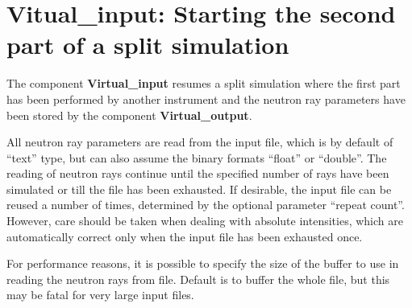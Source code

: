 \section{Vitual\_input: Starting the second part of a split simulation}
\label{virtual_input}


The component {\bf Virtual\_input} resumes a split simulation where the 
first part has been performed by another instrument and the neutron ray
parameters have been stored by the component {\bf Virtual\_output}.

All neutron ray parameters are read from the input file, which is by default
of ``text'' type, but can also assume the binary formats 
``float'' or ``double''. The reading of neutron rays continue until the 
specified number of rays have been simulated or 
till the file has been exhausted. If desirable, the input file
can be reused a number of times, determined by the optional parameter
``repeat count''. However, care should be taken when dealing with 
absolute intensities, which are automatically correct only
when the input file has been exhausted once.

For performance reasons, it is possible to specify the size of 
the buffer to use in reading the neutron rays from file. Default 
is to buffer the whole file, but this may be fatal for very large
input files.

